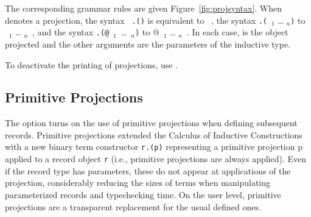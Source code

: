 The corresponding grammar rules are given Figure~\ref{fig:projsyntax}.
When {\qualid} denotes a projection, the syntax {\tt
  {\term}.({\qualid})} is equivalent to {\qualid~\term}, the syntax
{\term}{\tt .(}{\qualid}~{\termarg}$_1$ {\ldots} {\termarg}$_n${\tt )} to
{\qualid~{\termarg}$_1$ {\ldots} {\termarg}$_n$~\term}, and the syntax
{\term}{\tt .(@}{\qualid}~{\term}$_1$~\ldots~{\term}$_n${\tt )} to
{@\qualid~{\term}$_1$ {\ldots} {\term}$_n$~\term}. In each case, {\term}
is the object projected and the other arguments are the parameters of
the inductive type.

To deactivate the printing of projections, use 
{}.

\subsection{Primitive Projections}
\label{prim-proj}

The option {} turns on the use of primitive
projections when defining subsequent records. Primitive projections
extended the Calculus of Inductive Constructions with a new binary term
constructor {\tt r.(p)} representing a primitive projection p applied to
a record object {\tt r} (i.e., primitive projections are always
applied). Even if the record type has parameters, these do not appear at
applications of the projection, considerably reducing the sizes of terms
when manipulating parameterized records and typechecking time. On the
user level, primitive projections are a transparent replacement
for the usual defined ones.


